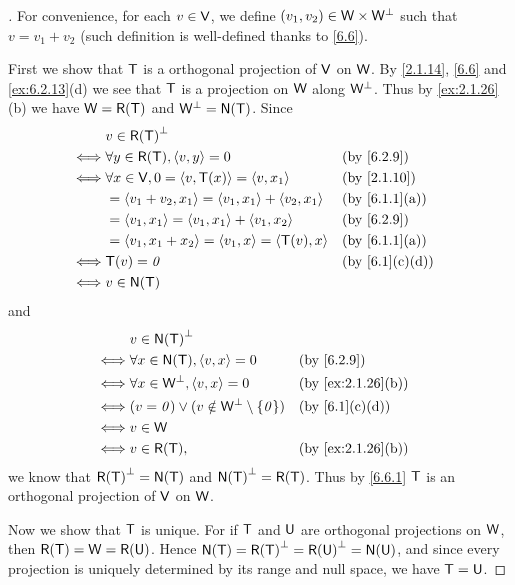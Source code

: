 \begin{proof}[]
  For convenience, for each \(v \in \mathsf{V}\), we define \((v_1, v_2) \in \mathsf{W} \times \mathsf{W}^{\perp}\) such that \(v = v_1 + v_2\) (such definition is well-defined thanks to \cref{6.6}).

  First we show that \(\mathsf{T}\) is a orthogonal projection of \(\mathsf{V}\) on \(\mathsf{W}\).
  By \cref{2.1.14}, \cref{6.6} and \cref{ex:6.2.13}(d) we see that \(\mathsf{T}\) is a projection on \(\mathsf{W}\) along \(\mathsf{W}^{\perp}\).
  Thus by \cref{ex:2.1.26}(b) we have \(\W = \rg{\T}\) and \(\W^{\perp} = \ns{\T}\).
  Since
  \begin{align*}
         & v \in \rg{\T}^{\perp}                                                       \\
    \iff & \forall y \in \rg{\T}, \inn{v, y} = 0                    &  & \by{6.2.9}    \\
    \iff & \forall x \in \V, 0 = \inn{v, \T(x)} = \inn{v, x_1}      &  & \by{2.1.10}   \\
         & = \inn{v_1 + v_2, x_1} = \inn{v_1, x_1} + \inn{v_2, x_1} &  & \by{6.1.1}[a] \\
         & = \inn{v_1, x_1} = \inn{v_1, x_1} + \inn{v_1, x_2}       &  & \by{6.2.9}    \\
         & = \inn{v_1, x_1 + x_2} = \inn{v_1, x} = \inn{\T(v), x}   &  & \by{6.1.1}[a] \\
    \iff & \T(v) = \zv                                              &  & \by{6.1}[c,d] \\
    \iff & v \in \ns{\T}
  \end{align*}
  and
  \begin{align*}
         & v \in \ns{\T}^{\perp}                                                           \\
    \iff & \forall x \in \ns{\T}, \inn{v, x} = 0                    &  & \by{6.2.9}        \\
    \iff & \forall x \in \W^{\perp}, \inn{v, x} = 0                 &  & \by{ex:2.1.26}[b] \\
    \iff & (v = \zv) \lor (v \notin \W^{\perp} \setminus \set{\zv}) &  & \by{6.1}[c,d]     \\
    \iff & v \in \W                                                                        \\
    \iff & v \in \rg{\T},                                           &  & \by{ex:2.1.26}[b]
  \end{align*}
  we know that \(\rg{\T}^{\perp} = \ns{\T}\) and \(\ns{\T}^{\perp} = \rg{\T}\).
  Thus by \cref{6.6.1} \(\mathsf{T}\) is an orthogonal projection of \(\mathsf{V}\) on \(\mathsf{W}\).

  Now we show that \(\mathsf{T}\) is unique.
  For if \(\mathsf{T}\) and \(\mathsf{U}\) are orthogonal projections on \(\mathsf{W}\), then \(\rg{\T} = \W = \rg{\U}\).
  Hence \(\ns{\T} = \rg{\T}^{\perp} = \rg{\U}^{\perp} = \ns{\U}\), and since every projection is uniquely determined by its range and null space, we have \(\mathsf{T} = \mathsf{U}\).
\end{proof}

